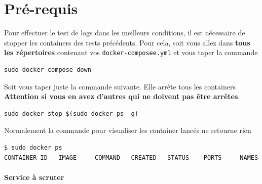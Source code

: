 \documentclass[french, 12pt]{article}%
\begin{document}
\section{Pré-requis}
Pour effectuer le test de logs dans les meilleurs conditions, il est nécessaire de stopper les containers des tests précédents. Pour cela, soit vous allez dans \textbf{tous les répertoires} contenant vos \verb?docker-composee.yml? et vous taper la commande 
\begin{lstlisting}[style=commande]
sudo docker compose down
\end{lstlisting}

\vspace*{0.5cm}

Soit vous taper juste la commande suivante. Elle arrête tous les containers \textbf{Attention si vous en avez d'autres qui ne doivent pas être arrêtes}.
\begin{lstlisting}[style=commande]
sudo docker stop $(sudo docker ps -q)
\end{lstlisting}


\vspace*{0.5cm}

Normalement la commande pour visualiser les container lancés ne retourne rien

\begin{lstlisting}[style=commande]
$ sudo docker ps
CONTAINER ID   IMAGE     COMMAND   CREATED   STATUS    PORTS     NAMES
\end{lstlisting}


\paragraph{Service à scruter} \
\end{document}
